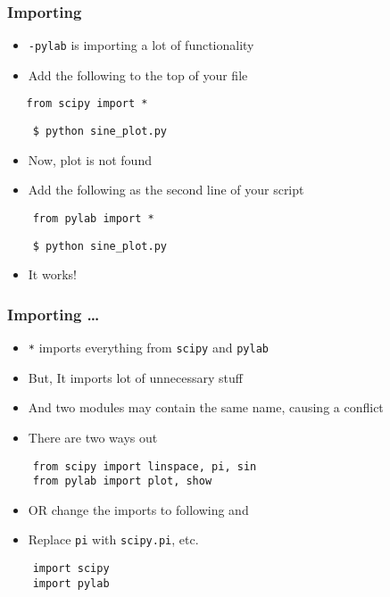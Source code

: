\begin{frame}[fragile]
  \frametitle{Importing}
  \begin{itemize}
  \item \texttt{-pylab} is importing a lot of functionality
  \item Add the following to the top of your file
  \end{itemize}
  \begin{lstlisting}
   from scipy import *
  \end{lstlisting}
  \begin{lstlisting}
    $ python sine_plot.py
  \end{lstlisting} %
  \begin{itemize}
  \item Now, plot is not found
  \item Add the following as the second line of your script
  \end{itemize}
  \begin{lstlisting}
    from pylab import *
  \end{lstlisting}
  \begin{lstlisting}
    $ python sine_plot.py
  \end{lstlisting} %
  \begin{itemize}
  \item It works!
  \end{itemize}
\end{frame}

\begin{frame}[fragile]
  \frametitle{Importing \ldots}
  \begin{itemize}
  \item \texttt{*} imports everything from \texttt{scipy} and
    \texttt{pylab}
  \item But, It imports lot of unnecessary stuff
  \item And two modules may contain the same name, causing a conflict
  \item There are two ways out
  \end{itemize}
  \begin{lstlisting}
    from scipy import linspace, pi, sin
    from pylab import plot, show
  \end{lstlisting}
  \begin{itemize}
  \item OR change the imports to following and 
  \item Replace \texttt{pi} with \texttt{scipy.pi}, etc. 
  \end{itemize}
  \begin{lstlisting}
    import scipy
    import pylab
  \end{lstlisting}
\end{frame}

